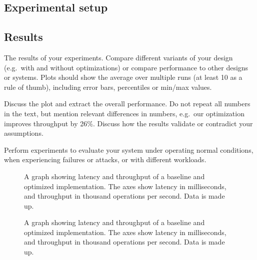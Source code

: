 
\subsection{Experimental setup}



\lipsum
\subsection{Results}
The results of your experiments. Compare different variants of your design (e.g.~with and without optimizations) or compare performance to other designs or systems. Plots should show the average over multiple runs (at least 10 as a rule of thumb), including error bars, percentiles or min/max values.

Discuss the plot and extract the overall performance. Do not repeat all numbers in the text, but mention relevant differences in numbers, e.g.~our optimization improves throughput by 26\%.
Discuss how the results validate or contradict your assumptions.

Perform experiments to evaluate your system under operating normal conditions, when experiencing failures or attacks, or with different workloads.
\begin{figure}
\caption{A graph showing latency and throughput of a baseline and optimized implementation. The axes show latency in milliseconds, and throughput in thousand operations per second. Data is made up.}
\end{figure}
\lipsum
\begin{figure}
    \caption{A graph showing latency and throughput of a baseline and optimized implementation. The axes show latency in milliseconds, and throughput in thousand operations per second. Data is made up.}
    \end{figure}

